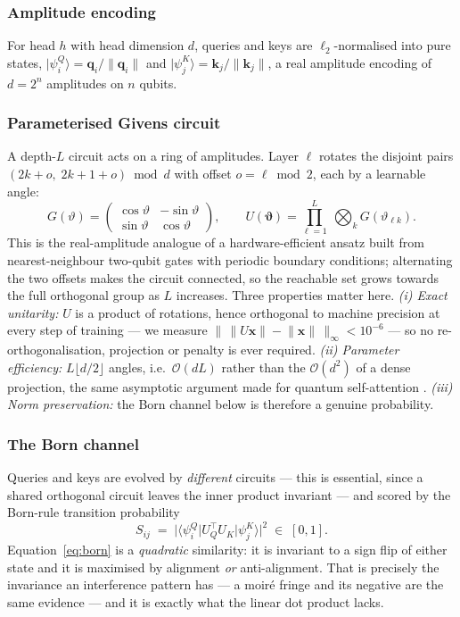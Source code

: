 \documentclass[conference]{IEEEtran}
\newcommand{\bs}[1]{\boldsymbol{#1}}
\newcommand{\ket}[1]{\lvert #1 \rangle}
\newcommand{\bra}[1]{\langle #1 \rvert}
\begin{document}
\subsubsection{Amplitude encoding}
For head $h$ with head dimension $d$, queries and keys are $\ell_{2}$-normalised
into pure states,
$\ket{\psi^{Q}_{i}} = \bs{q}_{i}/\lVert\bs{q}_{i}\rVert$ and
$\ket{\psi^{K}_{j}} = \bs{k}_{j}/\lVert\bs{k}_{j}\rVert$,
a real amplitude encoding of $d = 2^{n}$ amplitudes on $n$ qubits.

\subsubsection{Parameterised Givens circuit}
A depth-$L$ circuit acts on a ring of amplitudes. Layer $\ell$ rotates the disjoint
pairs $(2k+o,\;2k+1+o) \bmod d$ with offset $o=\ell \bmod 2$, each by a learnable
angle:
\begin{equation}
G(\vartheta)=\begin{pmatrix}\cos\vartheta & -\sin\vartheta\\
\sin\vartheta & \cos\vartheta\end{pmatrix},
\qquad
U(\bs{\vartheta})=\prod_{\ell=1}^{L}\ \bigotimes_{k} G(\vartheta_{\ell k}).
\label{eq:givens}
\end{equation}
This is the real-amplitude analogue of a hardware-efficient ansatz built from
nearest-neighbour two-qubit gates with periodic boundary conditions; alternating the
two offsets makes the circuit connected, so the reachable set grows towards the full
orthogonal group as $L$ increases. Three properties matter here.
\emph{(i) Exact unitarity:} $U$ is a product of rotations, hence orthogonal to
machine precision at every step of training --- we measure
$\lVert\,\lVert U\bs{x}\rVert - \lVert\bs{x}\rVert\,\rVert_{\infty} < 10^{-6}$ ---
so no re-orthogonalisation, projection or penalty is ever required.
\emph{(ii) Parameter efficiency:} $L\lfloor d/2\rfloor$ angles, i.e.\
$\mathcal{O}(dL)$ rather than the $\mathcal{O}(d^{2})$ of a dense projection, the
same asymptotic argument made for quantum self-attention
\cite{evans2025on,cherrat2024qvt}. \emph{(iii) Norm preservation:} the Born channel
below is therefore a genuine probability.

\subsubsection{The Born channel}
Queries and keys are evolved by \emph{different} circuits --- this is essential,
since a shared orthogonal circuit leaves the inner product invariant --- and scored
by the Born-rule transition probability
\begin{equation}
S_{ij} \;=\; \bigl\lvert \bra{\psi^{Q}_{i}} U_{Q}^{\!\top} U_{K} \ket{\psi^{K}_{j}} \bigr\rvert^{2}
\;\in\;[0,1].
\label{eq:born}
\end{equation}
Equation~\eqref{eq:born} is a \emph{quadratic} similarity: it is invariant to a sign
flip of either state and it is maximised by alignment \emph{or} anti-alignment. That
is precisely the invariance an interference pattern has --- a moir\'e fringe and its
negative are the same evidence --- and it is exactly what the linear dot product
lacks.
\end{document}
